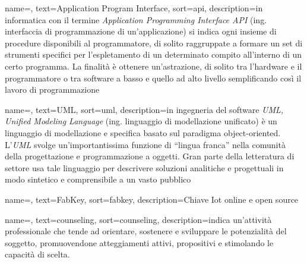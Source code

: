 
\renewcommand{\acronymname}{Acronimi e abbreviazioni}



\renewcommand{\glossaryname}{Glossario}

{
    name=,
    text=Application Program Interface,
    sort=api,
    description={in informatica con il termine \emph{Application Programming Interface API} (ing. interfaccia di programmazione di un'applicazione) si indica ogni insieme di procedure disponibili al programmatore, di solito raggruppate a formare un set di strumenti specifici per l'espletamento di un determinato compito all'interno di un certo programma. La finalità è ottenere un'astrazione, di solito tra l'hardware e il programmatore o tra software a basso e quello ad alto livello semplificando così il lavoro di programmazione}
}

{
    name=,
    text=UML,
    sort=uml,
    description={in ingegneria del software \emph{UML, Unified Modeling Language} (ing. linguaggio di modellazione unificato) è un linguaggio di modellazione e specifica basato sul paradigma object-oriented. L'\emph{UML} svolge un'importantissima funzione di ``lingua franca'' nella comunità della progettazione e programmazione a oggetti. Gran parte della letteratura di settore usa tale linguaggio per descrivere soluzioni analitiche e progettuali in modo sintetico e comprensibile a un vasto pubblico}
}

{
    name=,
    text=FabKey,
    sort=fabkey,
    description={Chiave Iot online e open source}
}

{
	name=,
    text=counseling,
    sort=counseling,
    description={indica un'attività professionale che tende ad orientare, sostenere e sviluppare le potenzialità del soggetto, promuovendone atteggiamenti attivi, propositivi e stimolando le capacità di scelta.}
}

